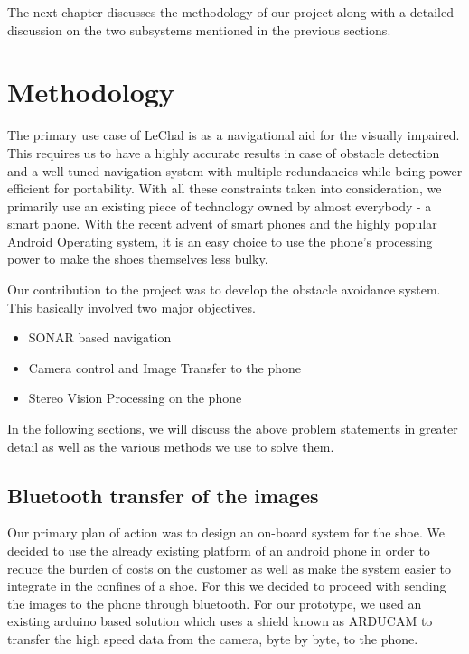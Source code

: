\documentclass[11pt]{report}
\begin{document}
The next chapter discusses the methodology of our project along with a detailed discussion on the two subsystems mentioned in the previous sections.

\chapter{Methodology}

The primary use case of LeChal is as a navigational aid for the visually impaired. This requires us to have a highly accurate results in case of obstacle detection and a well tuned navigation system with multiple redundancies while being power efficient for portability. With all these constraints taken into consideration, we primarily use an existing piece of technology owned by almost everybody - a smart phone. With the recent advent of smart phones and the highly popular Android Operating system, it is an easy choice to use the phone's processing power to make the shoes themselves less bulky.

Our contribution to the project was to develop the obstacle avoidance system. This basically involved two major objectives.

\begin{itemize}
\item SONAR based navigation
\item Camera control and Image Transfer to the phone
\item Stereo Vision Processing on the phone
\end{itemize}        

In the following sections, we will discuss the above problem statements in greater detail as well as the various methods we use to solve them.

\section{Bluetooth transfer of the images}

Our primary plan of action was to design an on-board system for the shoe. We decided to use the already existing platform of an android phone in order to reduce the burden of costs on the customer as well as make the system easier to integrate in the confines of a shoe. For this we decided to proceed with sending the images to the phone through bluetooth. For our prototype, we used an existing arduino based solution which uses a shield known as ARDUCAM to transfer the high speed data from the camera, byte by byte, to the phone. 
\end{document}
